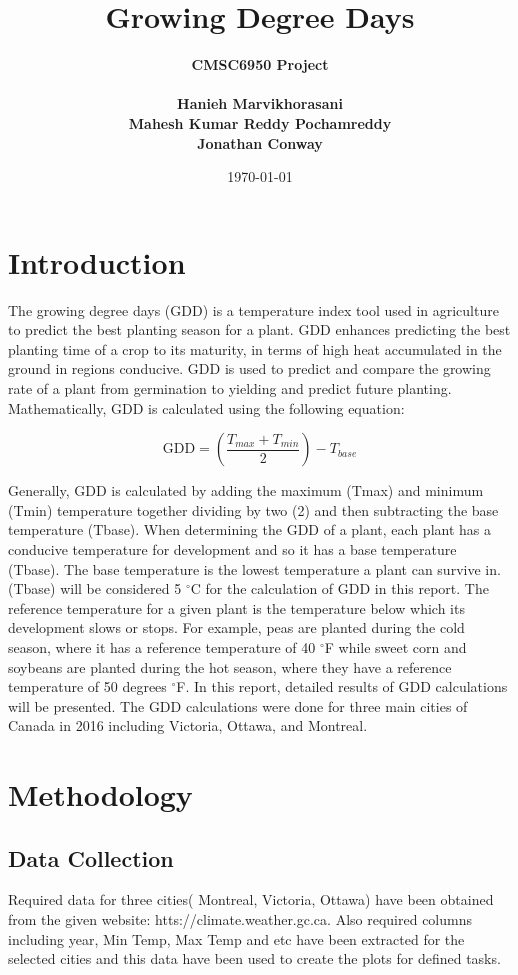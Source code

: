 \documentclass{article}
\title{Growing Degree Days}
\author{\bf{CMSC6950 Project}\\\\Hanieh Marvikhorasani\\ Mahesh Kumar Reddy Pochamreddy\\ Jonathan Conway}
\date{\today}
\begin{document}
	\clearpage\maketitle
	\thispagestyle{empty}

\newpage

\section{ \bf Introduction}
The growing degree days (GDD) is a temperature index tool used in agriculture to predict the best planting season for a plant. GDD enhances predicting the best planting time of a crop to its maturity, in terms of high heat accumulated in the ground in regions conducive. GDD is used to predict and compare the growing rate of a plant from germination to yielding and predict future planting.
Mathematically, GDD is calculated using the following equation:


\begin{equation}
\textrm{GDD} = \left(\frac{T_{max} + T_{min}}{2}\right) - T_{base}
\label{eqn:gdd}
\end{equation}

\noindent 
Generally, GDD is calculated by adding the maximum (Tmax) and minimum (Tmin) temperature together dividing by two (2) and then subtracting the base temperature (Tbase). 
When determining the GDD of a plant, each plant has a conducive temperature for development and so it has a base temperature (Tbase). The base temperature is the lowest temperature a plant can survive in. (Tbase) will be considered 5 $^{\circ}$C for the calculation of GDD in this report.
The reference temperature for a given plant is the temperature below which its development slows or stops. For example, peas are planted during the cold season, where it has a reference temperature of 40  $^{\circ}$F while sweet corn and soybeans are planted during the hot season, where they have a reference temperature of 50 degrees  $^{\circ}$F.
In this report, detailed results of GDD calculations will be presented. The GDD calculations were done for three main cities of Canada in 2016 including Victoria, Ottawa, and Montreal.



\section{ \bf Methodology}
\subsection{Data Collection}
Required data for three cities( Montreal, Victoria, Ottawa) have been obtained from the given website: htts://climate.weather.gc.ca. Also required columns including year, Min Temp, Max Temp and etc have been extracted for the selected cities and this data have been used to create the plots for defined tasks. 
\end{document}
